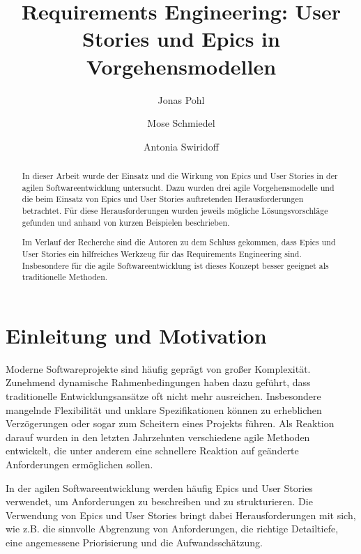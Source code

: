 \documentclass[acmtog]{acmart}
\begin{document}
\hypersetup{
	colorlinks,
	allcolors=blue,
	citecolor=.,
}

\title{Requirements Engineering: User Stories und Epics in Vorgehensmodellen}

\author{Jonas Pohl}
\author{Mose Schmiedel}
\authornotemark[1]
\author{Antonia Swiridoff}
\authornotemark[1]

\renewcommand{\shortauthors}{Pohl, Schmiedel and Swiridoff}

\begin{abstract}
	In dieser Arbeit wurde der Einsatz und die Wirkung von Epics und User Stories in der agilen Softwareentwicklung untersucht.
	Dazu wurden drei agile Vorgehensmodelle und die beim Einsatz von Epics und User Stories
	auftretenden Herausforderungen betrachtet.
	Für diese Herausforderungen wurden jeweils mögliche Lösungsvorschläge gefunden und anhand von kurzen Beispielen beschrieben.

	Im Verlauf der Recherche sind die Autoren zu dem Schluss gekommen, dass Epics und User Stories ein hilfreiches Werkzeug
	für das Requirements Engineering sind. Insbesondere für die agile Softwareentwicklung ist dieses Konzept besser geeignet als traditionelle
	Methoden.
\end{abstract}

\maketitle

\section{Einleitung und Motivation}
Moderne Softwareprojekte sind häufig geprägt von großer Komplexität.
Zunehmend dynamische Rahmenbedingungen haben dazu geführt, dass traditionelle Entwicklungsansätze oft nicht mehr ausreichen.
Insbesondere mangelnde Flexibilität und unklare Spezifikationen können zu erheblichen Verzögerungen oder sogar zum Scheitern eines Projekts führen.
Als Reaktion darauf wurden in den letzten Jahrzehnten verschiedene agile Methoden entwickelt, die unter anderem eine schnellere Reaktion auf geänderte Anforderungen ermöglichen sollen.

In der agilen Softwareentwicklung werden häufig Epics und User Stories verwendet, um Anforderungen zu beschreiben und zu strukturieren.
Die Verwendung von Epics und User Stories bringt dabei Herausforderungen mit sich, wie z.B. die sinnvolle Abgrenzung von Anforderungen, die richtige Detailtiefe, eine angemessene Priorisierung und die Aufwandsschätzung.
\end{document}
